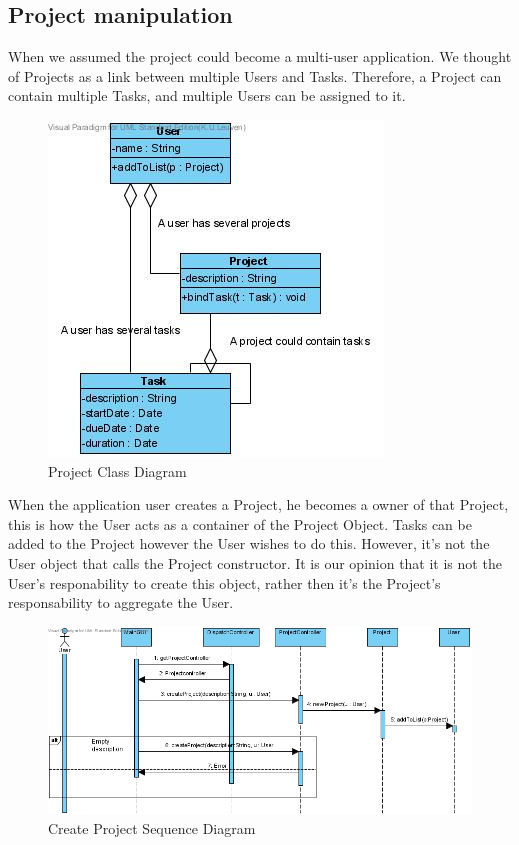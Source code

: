 \documentclass[a4paper,11pt]{article}
\begin{document}
		\subsection{Project manipulation}
			When we assumed the project could become a multi-user application. We thought of Projects as a link between multiple Users and Tasks. Therefore, a Project can contain multiple Tasks, and multiple Users can be assigned to it.
			\begin{figure}[h!]
				\begin{center}
					\includegraphics[scale=0.5]{images/project_class_diagram.jpg}
				\end{center}
				\caption{Project Class Diagram}
			\end{figure}
			When the application user creates a Project, he becomes a owner of that Project, this is how the User acts as a container of the Project Object. Tasks can be added to the Project however the User wishes to do this. However, it's not the User object that calls the Project constructor. It is our opinion that it is not the User's responability to create this object, rather then it's the Project's responsability to aggregate the User.
			\begin{figure}[h!]
				\begin{center}
					\includegraphics[scale=0.5]{images/create_project.jpg}
				\end{center}
				\caption{Create Project Sequence Diagram}
			\end{figure}
\end{document}
